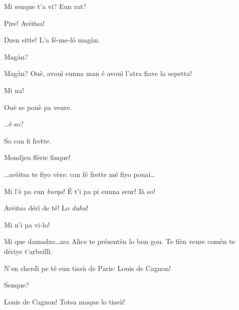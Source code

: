 \begin{drama}

\Guillaumespeaks Mi senque t’a vi? Eun rat?

\Cheriespeaks Pire! Avèitsa!


\Alicespeaks Dzen sitte! L'a fé-me-l\'o magàn.

\Cheriespeaks Magàn?

\Guillaumespeaks Magàn? Ouè, avouì eunna man é avouì l’atra fiave la sepetta!


\Alicespeaks{} Mi na!

\Cheriespeaks Ouè se pouè pa veure.


\Cheriespeaks{} \ldots é so?

\Alicespeaks So can fi frette.

\Cheriespeaks{} Mondjeu flèrie finque!


\Alicespeaks \ldots avèitsa te fiyo vère: can fé frette mé fiyo pouai\ldots


\Cheriespeaks Mi l'è pa eun \textit{burqa}! \'E t'i pa pi eunna seur! Ià so!


\Guillaumespeaks{} Avèitsa dérì de té! Lo \textit{dahu}!


\Alicespeaks Mi n'i pa vi-lo!

\Cheriespeaks Mi que damadzo\ldots ara Alice te prézentèn lo bon gou. Te fièn veure comèn te dériye t'arbeillì.


\Cheriespeaks N'en cherdì pe té eun tissù de Paris: Louis de Cagnon!

\Alicespeaks Senque?

\Cheriespeaks Louis de Cagnon! Totsa maque lo tissù!


\end{drama}
